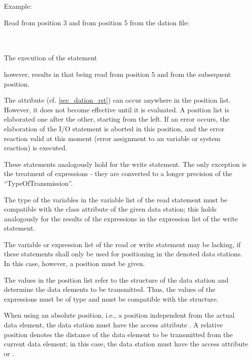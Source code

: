 Example:

Read  from position 3 and  from position 5 from the dation file:

\\
\\

The execution of the statement


however, results in that  being read from position 5 and  from the
subsequent position.

The  attribute (cf. \ref{sec_dation_rst}) can occur anywhere in the
 position list.
However, it does not become effective until it is evaluated. A position
list is elaborated one after the other, starting from the left. If an
error occurs, the elaboration of the I/O statement is aborted in this
position, and the error reaction valid at this moment (error assignment
to an  variable or system reaction) is executed.

These statements analogously hold for the write statement.
The only exception is the treatment of expressions - they are converted to 
a longer precision of the ``TypeOfTransmission''.


The type of the variables in the variable list of the read statement
must be compatible with the class attribute of the given data station;
this holds analogously for the results of the expressions in the
expression list of the write statement.

The variable or expression list of the read or write statement may be
lacking, if these statements shall only be used for positioning in the
denoted data stations. In this case, however, a position must be
given.

The values in the position list refer to the structure of the data
station and determine the data elements to be transmitted. Thus, the
values of the expressions must be of type  and must be compatible
with the structure.

When using an absolute position, i.e., a position independent from the
actual data element, the data station must have the access attribute
. A relative position denotes the distance of the data element to
be transmitted from the current data element; in this case, the data
station must have the access attribute 
 or .

